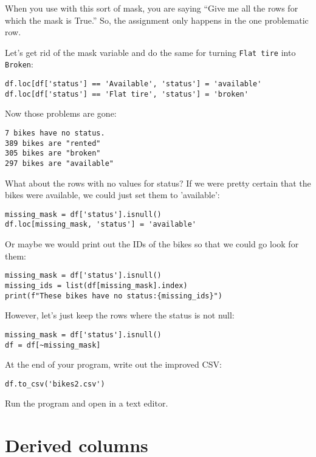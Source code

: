 When you use  with this sort of mask, you are saying
``Give me all the rows for which the mask is True.''  So, the
assignment only happens in the one problematic row.

Let's get rid of the mask variable and do the same for turning \texttt{Flat tire} into \texttt{Broken}:

\begin{Verbatim}
df.loc[df['status'] == 'Available', 'status'] = 'available'
df.loc[df['status'] == 'Flat tire', 'status'] = 'broken'
\end{Verbatim}

Now those problems are gone:
\begin{Verbatim}
7 bikes have no status.
389 bikes are "rented"
305 bikes are "broken"
297 bikes are "available"
\end{Verbatim}

What about the rows with no values for status? If we were pretty certain
that the bikes were available, we could just set them to 'available':

\begin{Verbatim}
missing_mask = df['status'].isnull()
df.loc[missing_mask, 'status'] = 'available'
\end{Verbatim}

Or maybe we would print out the IDs of the bikes so that we could go look for them:

\begin{Verbatim}
missing_mask = df['status'].isnull()
missing_ids = list(df[missing_mask].index)
print(f"These bikes have no status:{missing_ids}")
\end{Verbatim}

However, let's just keep the rows where the status is not null:
\begin{Verbatim}
missing_mask = df['status'].isnull()
df = df[~missing_mask]
\end{Verbatim}

At the end of your program, write out the improved CSV:

\begin{Verbatim}
df.to_csv('bikes2.csv')
\end{Verbatim}

Run the program and open  in a text editor.

\section{Derived columns}

